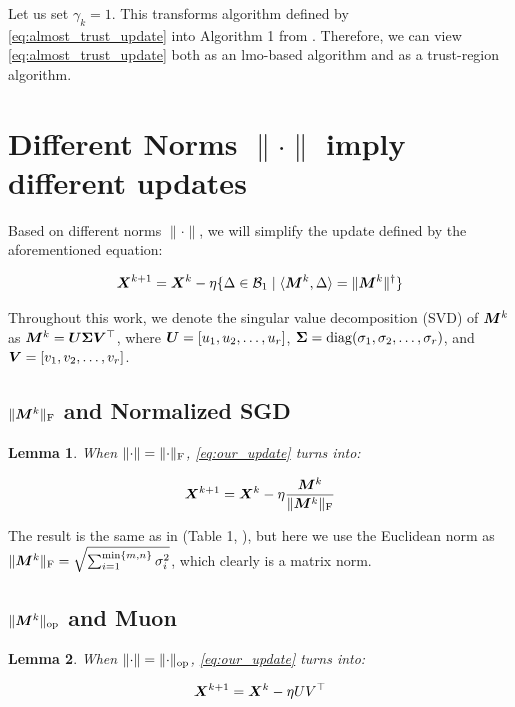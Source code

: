 \documentclass{article} %
\newtheorem{lemma}{Lemma}
\newcommand{\norm}[1]{\lVert #1\rVert}
\newcommand{\cB}{\mathcal{B}}
\DeclarePairedDelimiter{\normf}{\|}{\|_\mathrm{F}}
\DeclarePairedDelimiter{\norms}{\|}{\|_{\mathrm{op}}}
\def\<#1,#2>{\langle #1,#2\rangle}
\DeclareMathOperator{\diag}{diag}
\begin{document}
    Let us set $\gamma_k = 1$. This transforms algorithm defined by \cref{eq:almost_trust_update} into Algorithm 1 from \citet{kovalev2025understanding}. Therefore, we can view \cref{eq:almost_trust_update} both as an lmo-based algorithm and as a trust-region algorithm.

\section{Different Norms $\norm{\cdot}$ imply different updates}

    Based on different norms $\norm{\cdot}$, we will simplify the update defined by the aforementioned equation:

    \begin{equation}\label{eq:our_update}
        \mX^{k+1} = \mX^{k} - \eta \{\Delta \in \cB_1 \mid \<\mM^k, \Delta> = \norm{\mM^k}^\dagger\}
    \end{equation}

    Throughout this work, we denote the singular value decomposition (SVD) of ${\bm{M}}^k$ as ${\bm{M}}^k = {\bm{U}} {\bm{\Sigma}} {\bm{V}}^\top$, where ${\bm{U}} = [u_1, u_2, \dots, u_r]$, $\mSigma = \diag(\sigma_1, \sigma_2, \dots, \sigma_r)$, and  ${\bm{V}} = [v_1, v_2, \dots, v_r]$.

    \subsection{\texorpdfstring{$\normf{\mM^{k}}$ and Normalized SGD}{NSGD}}

        \begin{lemma}\label{lemma:nsgd_update}
            When $\norm{\cdot} = \normf{\cdot}$, \cref{eq:our_update} turns into:

            \begin{equation}\label{eq:nsgd_update}
                \mX^{k+1} = \mX^{k} - \eta \frac{\mM^k}{\normf{\mM^k}}
            \end{equation}

        \end{lemma}

        The result is the same as in (Table 1, \citet{pethick2025training}), but here we use the Euclidean norm as $\normf{\mM^k} = \sqrt{\sum_{i=1}^{\min\{m,n\}}\sigma_i^2}$, which clearly is a matrix norm.

    \subsection{\texorpdfstring{$\norms{\mM^{k}}$ and Muon}{Muon}}
    \begin{lemma}\label{lemma:muon_update}
        When $\norm{\cdot} = \norms{\cdot}$, \cref{eq:our_update} turns into:

        \begin{equation}\label{eq:muon_update}
            {\bm{X}}^{k+1} = {\bm{X}}^{k} - \eta U V^\top
        \end{equation}
    \end{lemma}
\end{document}
